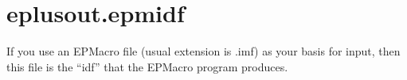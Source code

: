 \section{eplusout.epmidf}

If you use an EPMacro file (usual extension is .imf) as your basis for input, then this file is the ``idf'' that the EPMacro program produces.
